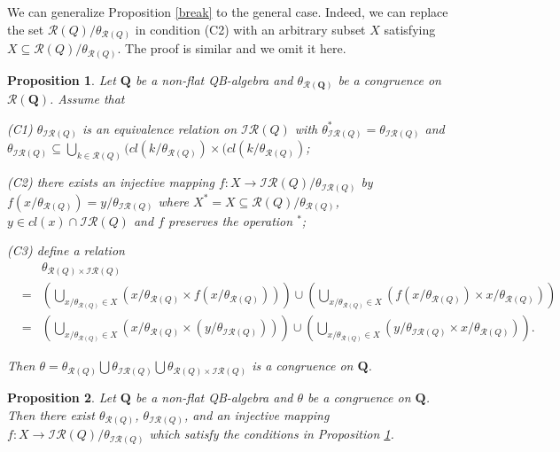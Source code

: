 \documentclass[12pt]{amsart}
\newtheorem{proposition}{Proposition}[section]
\theoremstyle{definition}
\theoremstyle{remark}
\numberwithin{equation}{section}
\begin{document}
We can generalize Proposition \ref{break} to the general case. Indeed, we  can replace the set $\mathscr{R}(Q)/\theta_{\mathscr{R}(Q)}$ in condition (C2) with an arbitrary subset $X$ satisfying $X\subseteq \mathscr{R}(Q)/\theta_{\mathscr{R}(Q)}$. The proof is similar and we omit it here.

\begin{proposition}\label{break2}
Let $\mathbf{Q}$ be a non-flat QB-algebra and $\theta_{\mathscr{R}(\mathbf{Q})}$ be a congruence on $\mathscr{R}(\mathbf{Q})$. Assume that

\emph{(C1)} $\theta_{\mathscr{IR}(Q)}$ is an equivalence relation on $\mathscr{IR}(Q)$ with $\theta_{\mathscr{IR}(Q)}^{\ast}=\theta_{\mathscr{IR}(Q)}$ and $\theta_{\mathscr{IR}(Q)} \subseteq \bigcup_{k\in \mathscr{R}({Q})}(cl(k/\theta_{\mathscr{R}(Q)})\times (cl(k/\theta_{\mathscr{R}(Q)})$;

\emph{(C2)} there exists an injective mapping $f: X \rightarrow \mathscr{IR}(Q)/\theta_{\mathscr{IR}(Q)}$ by $f(x/\theta_{\mathscr{R}(Q)})=y/\theta_{\mathscr{IR}(Q)}$ where
 $X^{\ast}=X\subseteq \mathscr{R}(Q)/\theta_{\mathscr{R}(Q)}$,  $y\in cl(x)\cap \mathscr{IR} (Q)$ and $f$ preserves the operation $^{\ast}$;


\emph{(C3)} define a relation
\begin{eqnarray*}
&&\theta_{\mathscr{R}(Q)\times \mathscr{IR}(Q)}  \\
  &=&(\bigcup_{x/\theta_{\mathscr{R}(Q)}\in X}(x/\theta_{\mathscr{R}(Q)}\times f(x/\theta_{\mathscr{R}(Q)})))\cup (\bigcup_{x/\theta_{\mathscr{R}(Q)}\in X}(f(x/\theta_{\mathscr{R}(Q)}) \times x/\theta_{\mathscr{R}(Q)} ))  \\
  &=& (\bigcup_{x/\theta_{\mathscr{R}(Q)}\in X}(x/\theta_{\mathscr{R}(Q)}\times (y/\theta_{\mathscr{IR}(Q)})))\cup (\bigcup_{x/\theta_{\mathscr{R}(Q)}\in X}(y/\theta_{\mathscr{IR}(Q)} \times x/\theta_{\mathscr{R}(Q)})).
\end{eqnarray*}

Then $\theta=\theta_{\mathscr{R}(Q)}\bigcup \theta_{\mathscr{IR}(Q)} \bigcup \theta_{\mathscr{R}(Q)\times \mathscr{IR}(Q)}$ is a congruence on $\mathbf{Q}$.
\end{proposition}



\begin{proposition}\label{theta123}
Let $\mathbf{Q}$ be a non-flat QB-algebra and $\theta$ be a congruence on $\mathbf{Q}$. Then there exist $\theta_{\mathscr{R}(Q)}$, $\theta_{\mathscr{IR}(Q)}$, and an injective mapping $f: X\rightarrow \mathscr{IR}(Q)/\theta_{\mathscr{IR}(Q)}$ which satisfy the conditions in Proposition \ref{break2}.
\end{proposition}
\end{document}

